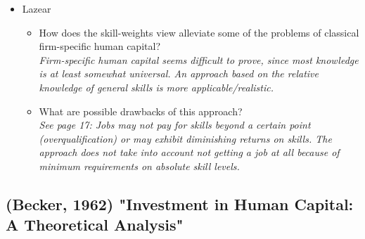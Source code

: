 \documentclass[12pt,a4paper]{article}
\begin{document}
\begin{itemize}
    \item Lazear
      \begin{itemize}
        \item How does the skill-weights view alleviate some of the problems of classical firm-specific human capital? \\
          \emph{Firm-specific human capital seems difficult to prove, since most knowledge is at least somewhat universal. An approach based on the relative knowledge of general skills is more applicable/realistic.}
        \item What are possible drawbacks of this approach? \\
          \emph{See page 17: Jobs may not pay for skills beyond a certain point (overqualification) or may exhibit diminishing returns on skills. The approach does not take into account not getting a job at all because of minimum requirements on absolute skill levels.}
      \end{itemize}

  \end{itemize}

  \subsection{(Becker, 1962) "Investment in Human Capital: A Theoretical Analysis"} %
  \label{prt:Becker}

\end{document}
